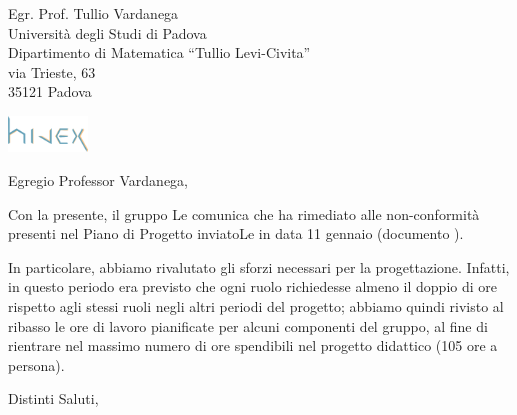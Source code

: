 \documentclass[a4paper]{letter} %
\date{Padova, \today}
\begin{document}
\begin{letter}{Egr. Prof. Tullio Vardanega\\
Università degli Studi di Padova\\
Dipartimento di Matematica “Tullio Levi-Civita”\\
via Trieste, 63\\
35121 Padova}

\includegraphics[width=80px]{../../util/hivex_logo3.png}

\opening{Egregio Professor Vardanega,}

Con la presente, il gruppo \hx{} Le comunica che ha rimediato alle non-conformità presenti nel Piano di Progetto inviatoLe in data 11 gennaio (documento \PdP).

In particolare, abbiamo rivalutato gli sforzi necessari per la progettazione. Infatti, in questo periodo era previsto che ogni ruolo richiedesse almeno il doppio di ore rispetto agli stessi ruoli negli altri periodi del progetto; abbiamo quindi rivisto al ribasso le ore di lavoro pianificate per alcuni componenti del gruppo, al fine di rientrare nel massimo numero di ore spendibili nel progetto didattico (105 ore a persona).

\closing{Distinti Saluti,}

\end{letter}
\end{document}
